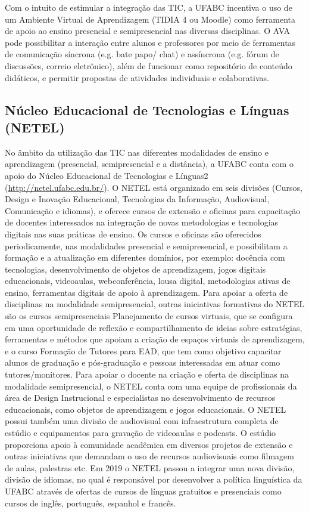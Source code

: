 Com o intuito de estimular a integração das TIC, a UFABC incentiva o uso de um
Ambiente Virtual de Aprendizagem (TIDIA 4 ou Moodle) como ferramenta de apoio
ao ensino presencial e semipresencial nas diversas disciplinas. 
O AVA pode possibilitar a interação entre alunos e professores por meio de
ferramentas de comunicação síncrona (e.g. bate papo/ chat) e assíncrona (e.g.
fórum de discussões, correio eletrônico), além de funcionar como repositório de
conteúdo didáticos, e permitir propostas de atividades individuais e
colaborativas.

\subsection{Núcleo Educacional de Tecnologias e Línguas (NETEL)}

No âmbito da utilização das TIC nas diferentes modalidades de ensino e
aprendizagem (presencial, semipresencial e a distância), a UFABC conta com o
apoio do Núcleo Educacional de Tecnologias e Línguas2
(\url{http://netel.ufabc.edu.br/}).
O NETEL está organizado em seis divisões (Cursos, Design e Inovação
Educacional, Tecnologias da Informação, Audiovisual, Comunicação e idiomas), e
oferece cursos de extensão e oficinas para capacitação de docentes interessados
na integração de novas metodologias e tecnologias digitais nas suas práticas de
ensino. 
Os cursos e oficinas são oferecidos periodicamente, nas modalidades presencial
e semipresencial, e possibilitam a formação e a atualização em diferentes
domínios, por exemplo: docência com tecnologias, desenvolvimento de objetos de
aprendizagem, jogos digitais educacionais, videoaulas, webconferência, lousa
digital, metodologias ativas de ensino, ferramentas digitais de apoio à
aprendizagem. 
Para apoiar a oferta de disciplinas na modalidade semipresencial, outras
iniciativas formativas do NETEL são os cursos semipresenciais Planejamento de
cursos virtuais, que se configura em uma oportunidade de reflexão e
compartilhamento de ideias sobre estratégias, ferramentas e métodos que apoiam
a criação de espaços virtuais de aprendizagem, e o curso Formação de Tutores
para EAD, que tem como objetivo capacitar alunos de graduação e pós-graduação e
pessoas interessadas em atuar como tutores/monitores. 
Para apoiar o docente na criação e oferta de disciplinas na modalidade
semipresencial, o NETEL conta com uma equipe de profissionais da área de Design
Instrucional e especialistas no desenvolvimento de recursos educacionais, como
objetos de aprendizagem e jogos educacionais. 
O NETEL possui também uma divisão de audiovisual com infraestrutura completa de
estúdio e equipamentos para gravação de videoaulas e podcasts. 
O estúdio proporciona apoio à comunidade acadêmica em diversos projetos de
extensão e outras iniciativas que demandam o uso de recursos audiovisuais como
filmagem de aulas, palestras etc. 
Em 2019 o NETEL passou a integrar uma nova divisão, divisão de idiomas, no qual
é responsável por desenvolver a política linguística da UFABC através de
ofertas de cursos de línguas gratuitos e presenciais como cursos de inglês,
português, espanhol e francês.

